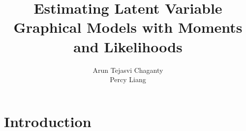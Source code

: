 \documentclass[xcolor={svgnames}]{beamer}
\title[Moments and Likelihoods]{Estimating Latent Variable Graphical Models with Moments and Likelihoods}
\author[Chaganty, Liang]{%
    Arun Tejasvi Chaganty\\
    Percy Liang
}
\institute{Stanford University}
\begin{document}
\begin{frame}
  \titlepage
\end{frame}

\section{Introduction}

% 
% 
% 
% 
% 
% 
% 
% 
\end{document}
